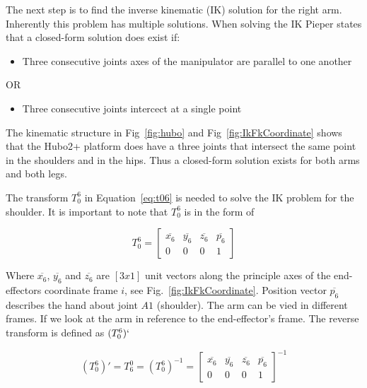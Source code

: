 The next step is to find the inverse kinematic (IK) solution for the right arm.
Inherently this problem has multiple solutions.
When solving the IK Pieper\cite{peiper1968kinematics} states that a closed-form solution does exist if:
\begin{itemize}
\item Three consecutive joints axes of the manipulator are parallel to one another
\end{itemize}

OR
\begin{itemize}
\item Three consecutive joints intercect at a single point
\end{itemize}

The kinematic structure in Fig~\ref{fig:hubo} and Fig~\ref{fig:IkFkCoordinate} shows that the Hubo2+ platform does have a three joints that intersect the same point in the shoulders and in the hips.
Thus a closed-form solution exists for both arms and both legs.

The transform $T_0^6$ in Equation~\ref{eq:t06} is needed to solve the IK problem for the shoulder.  
It is important to note that $T_0^6$ is in the form of

\begin{equation}\label{eq:T06}
T_0^6 = \left[ \begin{array}{cccc} 
\overline{x_6} & \overline{y_6} & \overline{z_6} & \overline{p_6} \\
0              & 0              & 0              & 1   
\end{array} \right]
\end{equation} 

Where $\overline{x_6}$, $\overline{y_6}$ and $\overline{z_6}$ are $[3x1]$ unit vectors along the principle axes of the end-effectors coordinate frame $i$, see Fig.~\ref{fig:IkFkCoordinate}.
Position vector $\overline{p_6}$ describes the hand about joint $A1$ (shoulder).
The arm can be vied in different frames.
If we look at the arm in reference to the end-effector's frame.
The reverse transform is defined as $(T_0^6)`$


\begin{equation}
(T_0^6)' = T_6^0 = (T_0^6)^{-1} = \left[ \begin{array}{cccc} 
\overline{x_6} & \overline{y_6} & \overline{z_6} & \overline{p_6} \\
0              & 0              & 0              & 1   
\end{array} \right]^{-1}
\end{equation} 

